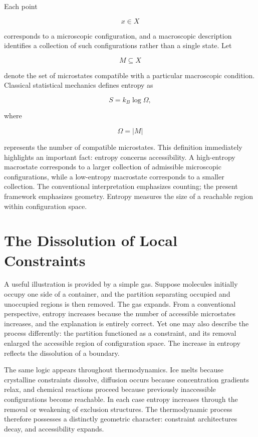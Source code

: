 \documentclass[11pt,oneside]{book}
\theoremstyle{plain}
\theoremstyle{definition}
\theoremstyle{remark}
\begin{document}
Each point

\begin{equation}
x
\in X
\end{equation}

corresponds to a microscopic configuration, and a macroscopic description identifies a collection of such configurations rather than a single state. Let

\begin{equation}
M
\subseteq X
\end{equation}

denote the set of microstates compatible with a particular macroscopic condition. Classical statistical mechanics defines entropy as

\begin{equation}
S
=
k_B
\log
\Omega,
\end{equation}

where

\begin{equation}
\Omega
=
|M|
\end{equation}

represents the number of compatible microstates. This definition immediately highlights an important fact: entropy concerns accessibility. A high-entropy macrostate corresponds to a larger collection of admissible microscopic configurations, while a low-entropy macrostate corresponds to a smaller collection. The conventional interpretation emphasizes counting; the present framework emphasizes geometry. Entropy measures the size of a reachable region within configuration space.

\section{The Dissolution of Local Constraints}

A useful illustration is provided by a simple gas. Suppose molecules initially occupy one side of a container, and the partition separating occupied and unoccupied regions is then removed. The gas expands. From a conventional perspective, entropy increases because the number of accessible microstates increases, and the explanation is entirely correct. Yet one may also describe the process differently: the partition functioned as a constraint, and its removal enlarged the accessible region of configuration space. The increase in entropy reflects the dissolution of a boundary.

The same logic appears throughout thermodynamics. Ice melts because crystalline constraints dissolve, diffusion occurs because concentration gradients relax, and chemical reactions proceed because previously inaccessible configurations become reachable. In each case entropy increases through the removal or weakening of exclusion structures. The thermodynamic process therefore possesses a distinctly geometric character: constraint architectures decay, and accessibility expands.
\end{document}
